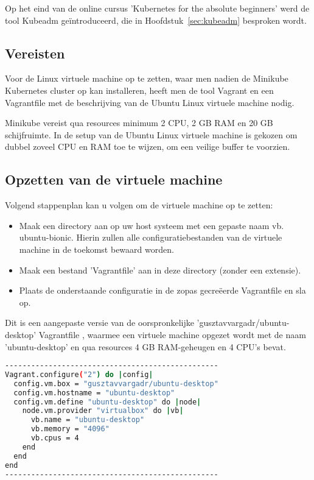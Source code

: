 Op het eind van de online cursus 'Kubernetes for the absolute beginners' werd de tool Kubeadm geïntroduceerd, die in Hoofdstuk~\ref{sec:kubeadm} besproken wordt. 

\subsection{Vereisten}

Voor de Linux virtuele machine op te zetten, waar men nadien de Minikube Kubernetes cluster op kan installeren, heeft men de tool Vagrant en een Vagrantfile met de beschrijving van de Ubuntu Linux virtuele machine nodig. 

Minikube vereist qua resources minimum 2 CPU, 2 GB RAM en 20 GB schijfruimte. In de setup van de Ubuntu Linux virtuele machine is gekozen om dubbel zoveel CPU en RAM toe te wijzen, om een veilige buffer te voorzien.  

\subsection{Opzetten van de virtuele machine}

Volgend stappenplan kan u volgen om de virtuele machine op te zetten:
\begin{itemize}
    \item Maak een directory aan op uw host systeem met een gepaste naam vb. ubuntu-bionic. Hierin zullen alle configuratiebestanden van de virtuele machine in de toekomst bewaard worden.
    \item Maak een bestand 'Vagrantfile' aan in deze directory (zonder een extensie).
    \item Plaats de onderstaande configuratie in de zopas gecreëerde Vagrantfile en sla op.
\end{itemize}
 
Dit is een aangepaste versie van de oorspronkelijke 'gusztavvargadr/ubuntu-desktop' Vagrantfile \autocite{Varga2022}, waarmee een virtuele machine opgezet wordt met de naam 'ubuntu-desktop' en qua resources 4 GB RAM-geheugen en 4 CPU's bevat. 

\begin{lstlisting}[language=bash]
-------------------------------------------------
Vagrant.configure("2") do |config|
  config.vm.box = "gusztavvargadr/ubuntu-desktop"
  config.vm.hostname = "ubuntu-desktop"
  config.vm.define "ubuntu-desktop" do |node|
    node.vm.provider "virtualbox" do |vb|
      vb.name = "ubuntu-desktop"
      vb.memory = "4096"
      vb.cpus = 4
    end
  end
end
-------------------------------------------------
\end{lstlisting}

